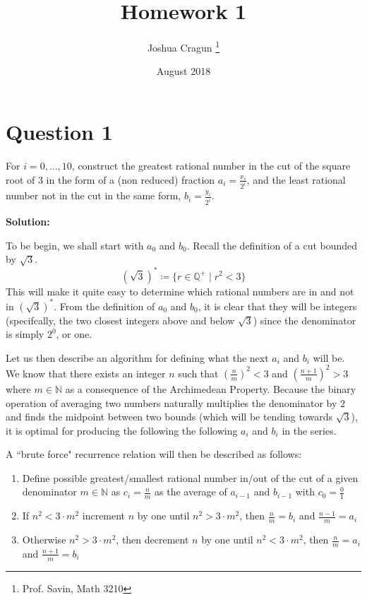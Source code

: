 \documentclass[12pt, letterpaper]{article}
\title{Homework 1}
\author{Joshua Cragun \thanks{Prof. Savin, Math 3210}}
\date{August 2018}
\begin{document}
\begin{titlepage}
\maketitle
\end{titlepage}

\section*{Question 1}
For $i = 0, ..., 10$, construct the greatest rational number in the cut of the
square root of $3$ in the form of a (non reduced) fraction $a_i = \frac{x_i}{2^i}$,
and the least rational number not in the cut in the same form, $b_i = \frac{y_i}{2^i}$.

\noindent\textbf{Solution:}

To be begin, we shall start with $a_0$ and $b_0$. Recall the definition of a cut bounded by $\sqrt{3}$.
$$ (\sqrt{3})^{*} \coloneqq \{r \in \mathbb{Q}^+ \mid r^2 < 3 \} $$
This will make it quite easy to determine which rational numbers are in and not
in $(\sqrt{3})^{*}$. From the definition of $a_0$ and $b_0$, it is clear that they will
be integers (specifcally, the two closest integers above and below $\sqrt{3}$) since the denominator is simply $2^0$, or one.

Let us then describe an algorithm for defining what the next $a_i$ and $b_i$ will be.
We know that there exists an integer $n$ such that $(\frac{n}{m})^2 < 3$ and $(\frac{n + 1}{m})^2 > 3$ where $m \in \mathbb{N}$ as a consequence of the Archimedean Property.
Because the binary operation of averaging two numbers naturally multiplies the denominator by $2$ and finds the midpoint between
two bounds (which will be tending towards $\sqrt{3}$), it is optimal for producing the following the following $a_i$ and $b_i$ in the series.

A ``brute force" recurrence relation will then be described as follows:

\begin{enumerate}
  \item Define possible greatest/smallest rational number in/out of the cut of a given denominator $m \in \mathbb{N}$ as $c_i = \frac{n}{m}$ as the average of $a_{i-1}$ and $b_{i-1}$ with $c_0 = \frac{0}{1}$
  \item If $n^2 < 3 \cdot m^2$ increment $n$ by one until $n^2 > 3 \cdot m^2$, then $\frac{n}{m} = b_i$ and $\frac{n - 1}{m} = a_i$
  \item Otherwise $n^2 > 3 \cdot m^2$, then decrement $n$ by one until $n^2 < 3 \cdot m^2$, then $\frac{n}{m} = a_i$ and $\frac{n + 1}{m} = b_i$
\end{enumerate}
\end{document}
